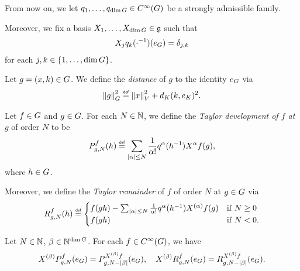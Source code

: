 From now on,
we let $q_1, \dots, q_{\dim G} \in {C^\infty(G)}$
be a strongly admissible family.

Moreover, we fix a basis $X_1, \dots, X_{\dim G} \in \mathfrak{g}$ such that
\begin{align*}
    {X_j} q_k(\cdot^{-1})(e_G) = \delta_{j,k}
\end{align*}
for each $j, k \in \{1, \dots, \dim G\}$.

\begin{definition}
    Let $g = (x, k) \in G$.
    We define the \emph{distance} of $g$ to the identity $e_G$ via
    \begin{align*}
        \norm [\Group] g^2
        \defeq
        \norm x^2 + \dist [\CompactGroup] k {e_\CompactGroup}^2.
    \end{align*}
\end{definition}

\begin{definition}
    Let $f \in G$ and $g \in G$.
    For each $N \in \mathbb{N}$,
    we define the \emph{Taylor development of $f$ at $g$} of order $N$ to be
    \begin{align*}
        \TaylorPolynomial f g N(h)
        \defeq
        \sum_{\abs \alpha \leq N} \frac 1 {\alpha!} q^\alpha(h^{-1}) \LeftDifferentialOperator \alpha f(g),
    \end{align*}
    where $h \in G$.

    Moreover,
    we define the \emph{Taylor remainder} of $f$ of order $N$ at $g \in G$ via
    \begin{align*}
        \TaylorRemainder f g N(h) \defeq
        \begin{cases}
            f(g h) - \sum_{\abs \alpha \leq N} \frac 1 {\alpha!} q^\alpha(h^{-1}) \TaylorLeftDifferentialOperator \alpha f(g) & \text{if } N \geq 0\\
            f(g h) & \text{if } N < 0.
        \end{cases}
    \end{align*}
\end{definition}

\begin{lemma}
\label{lemma:derivative_of_Taylor_polynomial_and_remainder}
    Let $N \in \mathbb{N}$, $\beta \in \mathbb{N}^{\dim G}$.
    For each $f \in {C^\infty(G)}$,
    we have
    \begin{align*}
        X^{(\beta)} P^{f}_{g, N} (e_G)
        = P^{X^{(\beta)} f}_{g, N - \left|{\beta}\right|} (e_G),
        \quad
        X^{(\beta)} R^{f}_{g, N} (e_G)
        = R^{X^{(\beta)} f}_{g, N - \left|{\beta}\right|} (e_G).
    \end{align*}
\end{lemma}

